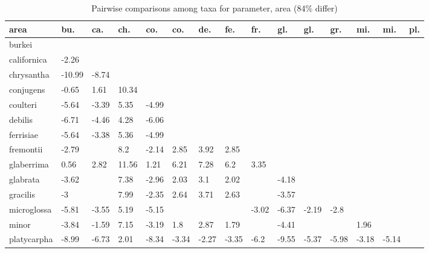 \begin{table}[ht]
\centering
\caption{Pairwise comparisons among taxa for parameter, area (84\% differ)} 
\begin{tabular}{lllllllllllllll}
  \hline
area & bu. & ca. & ch. & co. & co. & de. & fe. & fr. & gl. & gl. & gr. & mi. & mi. & pl. \\ 
  \hline
burkei &  &  &  &  &  &  &  &  &  &  &  &  &  &  \\ 
  californica & -2.26 &  &  &  &  &  &  &  &  &  &  &  &  &  \\ 
  chrysantha & -10.99 & -8.74 &  &  &  &  &  &  &  &  &  &  &  &  \\ 
  conjugens & -0.65 & 1.61 & 10.34 &  &  &  &  &  &  &  &  &  &  &  \\ 
  coulteri & -5.64 & -3.39 & 5.35 & -4.99 &  &  &  &  &  &  &  &  &  &  \\ 
  debilis & -6.71 & -4.46 & 4.28 & -6.06 &  &  &  &  &  &  &  &  &  &  \\ 
  ferrisiae & -5.64 & -3.38 & 5.36 & -4.99 &  &  &  &  &  &  &  &  &  &  \\ 
  fremontii & -2.79 &  & 8.2 & -2.14 & 2.85 & 3.92 & 2.85 &  &  &  &  &  &  &  \\ 
  glaberrima & 0.56 & 2.82 & 11.56 & 1.21 & 6.21 & 7.28 & 6.2 & 3.35 &  &  &  &  &  &  \\ 
  glabrata & -3.62 &  & 7.38 & -2.96 & 2.03 & 3.1 & 2.02 &  & -4.18 &  &  &  &  &  \\ 
  gracilis & -3 &  & 7.99 & -2.35 & 2.64 & 3.71 & 2.63 &  & -3.57 &  &  &  &  &  \\ 
  microglossa & -5.81 & -3.55 & 5.19 & -5.15 &  &  &  & -3.02 & -6.37 & -2.19 & -2.8 &  &  &  \\ 
  minor & -3.84 & -1.59 & 7.15 & -3.19 & 1.8 & 2.87 & 1.79 &  & -4.41 &  &  & 1.96 &  &  \\ 
  platycarpha & -8.99 & -6.73 & 2.01 & -8.34 & -3.34 & -2.27 & -3.35 & -6.2 & -9.55 & -5.37 & -5.98 & -3.18 & -5.14 &  \\ 
   \hline
\end{tabular}
\end{table}
